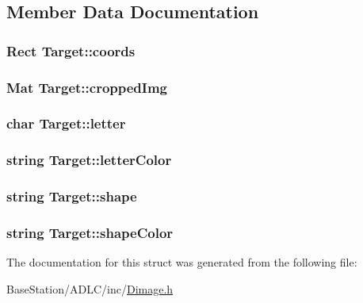 \subsection{Member Data Documentation}
\hypertarget{structTarget_a7aeb05fae417de29ec649370007eba21}{
\subsubsection[{coords}]{\setlength{\rightskip}{0pt plus 5cm}Rect Target\-::coords}}\label{structTarget_a7aeb05fae417de29ec649370007eba21}
\hypertarget{structTarget_ae37fee2ea260011ecacbfb0f23b3f9ab}{
\subsubsection[{cropped\-Img}]{\setlength{\rightskip}{0pt plus 5cm}Mat Target\-::cropped\-Img}}\label{structTarget_ae37fee2ea260011ecacbfb0f23b3f9ab}
\hypertarget{structTarget_a489063b23f51649a9d16f988106021e3}{
\subsubsection[{letter}]{\setlength{\rightskip}{0pt plus 5cm}char Target\-::letter}}\label{structTarget_a489063b23f51649a9d16f988106021e3}
\hypertarget{structTarget_acd28a79f6727170208e1a642e7471bc3}{
\subsubsection[{letter\-Color}]{\setlength{\rightskip}{0pt plus 5cm}string Target\-::letter\-Color}}\label{structTarget_acd28a79f6727170208e1a642e7471bc3}
\hypertarget{structTarget_adc3bbb55cca6bd906f5e8615a16d341e}{
\subsubsection[{shape}]{\setlength{\rightskip}{0pt plus 5cm}string Target\-::shape}}\label{structTarget_adc3bbb55cca6bd906f5e8615a16d341e}
\hypertarget{structTarget_a96b4e515aa265beb1996e430a4c5de07}{
\subsubsection[{shape\-Color}]{\setlength{\rightskip}{0pt plus 5cm}string Target\-::shape\-Color}}\label{structTarget_a96b4e515aa265beb1996e430a4c5de07}


The documentation for this struct was generated from the following file\-:\begin{DoxyCompactItemize}
\item 
Base\-Station/\-A\-D\-L\-C/inc/\hyperlink{BaseStation_2ADLC_2inc_2Dimage_8h}{Dimage.\-h}\end{DoxyCompactItemize}
